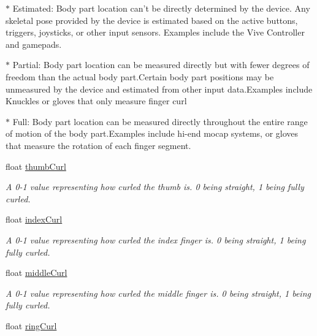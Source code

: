 \begin{DoxyCompactItemize}
\begin{DoxyCompactList}
$\ast$ Estimated\+: Body part location can’t be directly determined by the device. Any skeletal pose provided by the device is estimated based on the active buttons, triggers, joysticks, or other input sensors. Examples include the Vive Controller and gamepads. 

$\ast$ Partial\+: Body part location can be measured directly but with fewer degrees of freedom than the actual body part.\+Certain body part positions may be unmeasured by the device and estimated from other input data.\+Examples include Knuckles or gloves that only measure finger curl 

$\ast$ Full\+: Body part location can be measured directly throughout the entire range of motion of the body part.\+Examples include hi-\/end mocap systems, or gloves that measure the rotation of each finger segment. \end{DoxyCompactList}\item 
float \mbox{\hyperlink{class_valve_1_1_v_r_1_1_steam_v_r___action___skeleton_a920e47de1024d12f1c866a2894fb2e00}{thumb\+Curl}}
\begin{DoxyCompactList}\small\item\em A 0-\/1 value representing how curled the thumb is. 0 being straight, 1 being fully curled. \end{DoxyCompactList}\item 
float \mbox{\hyperlink{class_valve_1_1_v_r_1_1_steam_v_r___action___skeleton_af2e4283e738877f71330b48a34fdd482}{index\+Curl}}
\begin{DoxyCompactList}\small\item\em A 0-\/1 value representing how curled the index finger is. 0 being straight, 1 being fully curled. \end{DoxyCompactList}\item 
float \mbox{\hyperlink{class_valve_1_1_v_r_1_1_steam_v_r___action___skeleton_ae178489f9bfd0049e7dbbf5b0259553a}{middle\+Curl}}
\begin{DoxyCompactList}\small\item\em A 0-\/1 value representing how curled the middle finger is. 0 being straight, 1 being fully curled. \end{DoxyCompactList}\item 
float \mbox{\hyperlink{class_valve_1_1_v_r_1_1_steam_v_r___action___skeleton_aeffa6c5482f34a0a4975d79eb806e218}{ring\+Curl}}

\end{DoxyCompactItemize}
